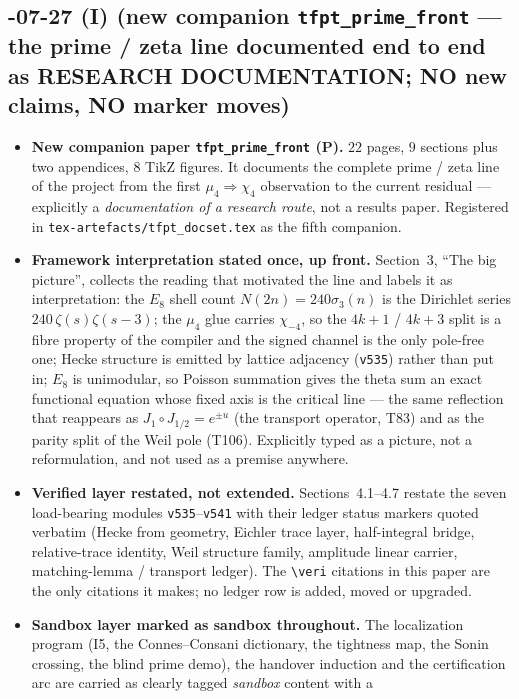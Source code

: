 \documentclass[11pt]{article}
\providecommand{\vref}[1]{\texttt{#1}}
\begin{document}
\subsection*{-07-27 (I) (new companion \texttt{tfpt\_prime\_front} --- the prime / zeta line documented end to end as RESEARCH DOCUMENTATION; NO new claims, NO marker moves)}
\begin{itemize}[leftmargin=1.5em]
\item \textbf{New companion paper \texttt{tfpt\_prime\_front} (P).} $22$ pages, $9$ sections plus two
appendices, $8$ TikZ figures. It documents the complete prime / zeta line of the project from the first
$\mu_4\Rightarrow\chi_4$ observation to the current residual --- explicitly a \emph{documentation of a
research route}, not a results paper. Registered in \texttt{tex-artefacts/tfpt\_docset.tex} as the fifth
companion.
\item \textbf{Framework interpretation stated once, up front.} Section~3, ``The big picture'', collects
the reading that motivated the line and labels it as interpretation: the $E_8$ shell count
$N(2n)=240\sigma_3(n)$ is the Dirichlet series $240\,\zeta(s)\zeta(s-3)$; the $\mu_4$ glue carries
$\chi_{-4}$, so the $4k{+}1$ / $4k{+}3$ split is a fibre property of the compiler and the signed channel
is the only pole-free one; Hecke structure is emitted by lattice adjacency (\vref{v535}) rather than put
in; $E_8$ is unimodular, so Poisson summation gives the theta sum an exact functional equation whose
fixed axis is the critical line --- the same reflection that reappears as $J_1\circ J_{1/2}=e^{\pm u}$
(the transport operator, T83) and as the parity split of the Weil pole (T106). Explicitly typed as a
picture, not a reformulation, and not used as a premise anywhere.
\item \textbf{Verified layer restated, not extended.} Sections~4.1--4.7 restate the seven load-bearing
modules \vref{v535}--\vref{v541} with their ledger status markers quoted verbatim (Hecke from geometry,
Eichler trace layer, half-integral bridge, relative-trace identity, Weil structure family, amplitude
linear carrier, matching-lemma / transport ledger). The \texttt{\textbackslash veri} citations in this
paper are the only citations it makes; no ledger row is added, moved or upgraded.
\item \textbf{Sandbox layer marked as sandbox throughout.} The localization program (I5, the
Connes--Consani dictionary, the tightness map, the Sonin crossing, the blind prime demo), the handover
induction and the certification arc are carried as clearly tagged \emph{sandbox} content with a

\end{itemize}
\end{document}
